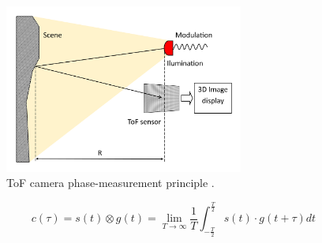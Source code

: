 \begin{figure}[H]
	\centering
	\includegraphics[width=0.7\textwidth]{figures/tof.png}
	\caption{ToF camera phase-measurement principle \cite{Lianhua}.}
	\label{fig::tof}
\end{figure}

\begin{equation}
\label{eq::tof::01}
c(\tau) = s(t) \otimes g(t) = \lim_{T \to \infty} {\frac{1}{T}} \int_{-\frac{T}{2}}^{\frac{T}{2}}{s(t) \cdot g(t+ \tau)}dt
\end{equation}

